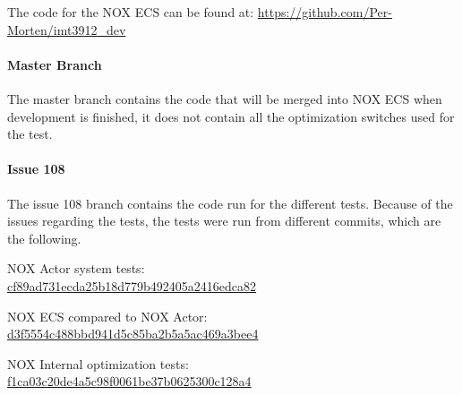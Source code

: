 The code for the NOX ECS can be found at:
\url{https://github.com/Per-Morten/imt3912_dev}

\paragraph{Master Branch}
The master branch contains the code that will be merged into NOX ECS when development is finished,
it does not contain all the optimization switches used for the test.

\paragraph{Issue 108}
The issue 108 branch contains the code run for the different tests.
Because of the issues regarding the tests, the tests were run from different commits, which are the following.

NOX Actor system tests:\\
\href{https://github.com/Per-Morten/imt3912_dev/tree/cf89ad731ecda25b18d779b492405a2416edca82}{cf89ad731ecda25b18d779b492405a2416edca82}

NOX ECS compared to NOX Actor:\\
\href{https://github.com/Per-Morten/imt3912_dev/tree/d3f5554c488bbd941d5c85ba2b5a5ac469a3bee4}{d3f5554c488bbd941d5c85ba2b5a5ac469a3bee4}

NOX Internal optimization tests:\\
\href{https://github.com/Per-Morten/imt3912_dev/tree/f1ca03c20de4a5c98f0061be37b0625300c128a4}{f1ca03c20de4a5c98f0061be37b0625300c128a4}
